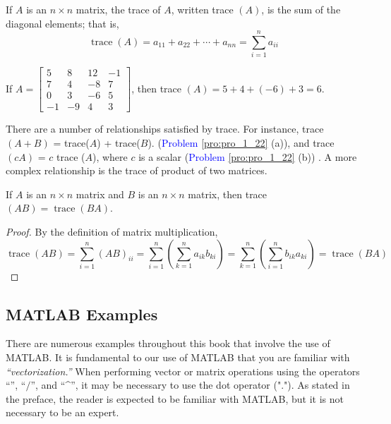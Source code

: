 \documentclass[../main.tex]{subfiles}
\begin{document}
\begin{definition}
	\label{defn:defn_1_8}
	If $A$ is an $n \times n$ matrix, the trace of $A$, written trace $(A)$, is the sum of the diagonal elements; that is,
$$
\operatorname{trace}(A)=a_{11}+a_{22}+\cdots+a_{n n}=\sum_{i=1}^{n} a_{i i}
$$
\end{definition}

\begin{example}If $A=
\begin{bmatrix}
	5 & 8 & 12 & -1 \\
	7 & 4 & -8 & 7 \\
	 0 & 3 & -6 & 5 \\
	 -1 & -9 & 4 & 3
\end{bmatrix}$,
 then trace $(A)=5+4+(-6)+3=6$.
 \end{example}

There are a number of relationships satisfied by trace. For instance, \textsf{trace}$(A+B)$ = \textsf{trace}($A$) + \textsf{trace}($B$).
(\textcolor{blue}{Problem \ref{pro:pro_1_22}} (a)), and \textsf{trace} $(c A)$ = $c$ \textsf{trace} ($A$), where $c$ is a scalar (\textcolor{blue}{Problem \ref{pro:pro_1_22}} (b)) . A more complex relationship is the trace of product of two matrices.

\begin{theorem}
	\label{theo:theo_1_2}
	If $A$ is an $n \times n$ matrix and $B$ is an $n \times n$ matrix, then trace $(A B)=\operatorname{trace}(B A)$.
\end{theorem}


\begin{proof}
	By the definition of matrix multiplication,
	$$
	\operatorname{trace}(A B)=\sum_{i=1}^{n}(A B)_{i i}=\sum_{i=1}^{n}\left(\sum_{k=1}^{n} a_{i k} b_{k i}\right)=\sum_{k=1}^{n}\left(\sum_{i=1}^{n} b_{i k} a_{k i}\right)=\operatorname{trace}(B A)
	$$
\end{proof}

\subsection{MATLAB Examples}
There are numerous examples throughout this book that involve the use of MATLAB. It is fundamental to our use of
MATLAB that you are familiar with \emph{“vectorization.”} When performing vector or matrix operations using the operators “\textasteriskcentered”,
“$/$”, and “\textasciicircum”, it may be necessary to use the dot operator ("."). As stated in the preface, the reader is expected to be familiar
with MATLAB, but it is not necessary to be an expert. \\
\end{document}
